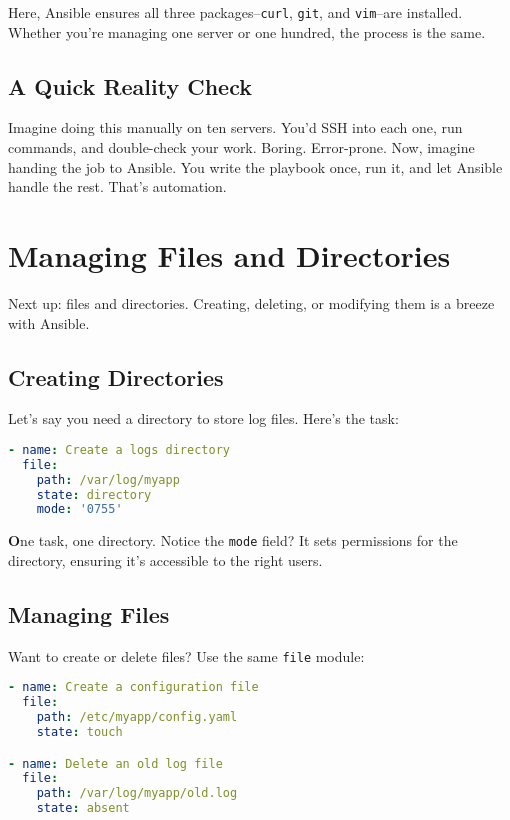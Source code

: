Here, Ansible ensures all three packages--\texttt{curl}, \texttt{git}, and \texttt{vim}--are installed. Whether you're managing one server or one hundred, the process is the same.

\subsection{A Quick Reality Check}

Imagine doing this manually on ten servers. You'd SSH into each one, run commands, and double-check your work. Boring. Error-prone. Now, imagine handing the job to Ansible. You write the playbook once, run it, and let Ansible handle the rest. That's automation.

\section{Managing Files and Directories}

Next up: files and directories. Creating, deleting, or modifying them is a breeze with Ansible.

\subsection{Creating Directories}

Let's say you need a directory to store log files. Here's the task:
\begin{lstlisting}[language=yaml, caption=Creating a Directory]
- name: Create a logs directory
  file:
    path: /var/log/myapp
    state: directory
    mode: '0755'
\end{lstlisting}

\textbf{O}ne task, one directory. Notice the \texttt{mode} field? It sets permissions for the directory, ensuring it's accessible to the right users.

\subsection{Managing Files}

Want to create or delete files? Use the same \texttt{file} module:
\begin{lstlisting}[language=yaml, caption=Creating or Deleting Files]
- name: Create a configuration file
  file:
    path: /etc/myapp/config.yaml
    state: touch

- name: Delete an old log file
  file:
    path: /var/log/myapp/old.log
    state: absent
\end{lstlisting}

